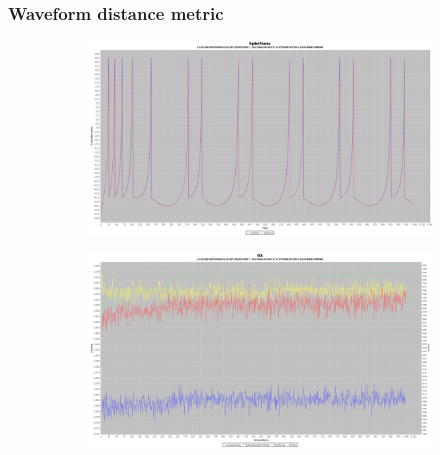 \documentclass[10pt]{article}
\begin{document}
		\subsubsection{Waveform distance metric}
			\begin{figure}[H]
				\centering
					\begin{subfigure}{.5\textwidth}
						\centering
						\includegraphics[width=\linewidth]{./../images/izzy2/wave/plot.png}

						\label{fig:sub6a}
					\end{subfigure}%
					\begin{subfigure}{.5\textwidth}
						\centering
						\includegraphics[width=\linewidth]{./../images/izzy2/wave/prog.png}
						
						\label{fig:sub6b}
					\end{subfigure}
					
					\label{fig:plot6}
			\end{figure}
\end{document}
